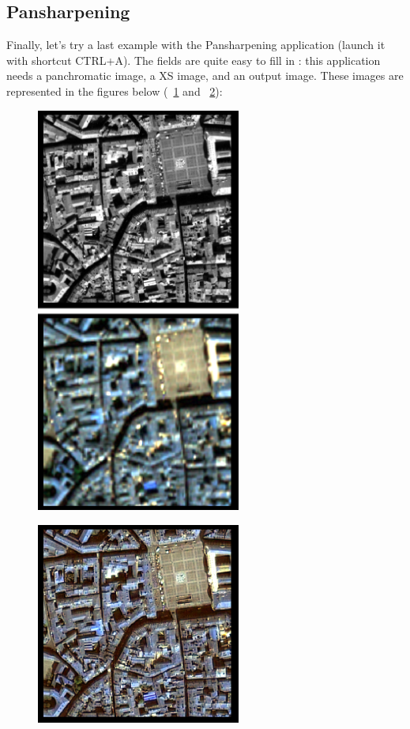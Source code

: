 \subsection{Pansharpening}\label{ssec:monpansh}
Finally, let's try a last example with the Pansharpening application (launch it with shortcut CTRL+A).
The fields are quite easy to fill in : this application needs a panchromatic image, a XS image, and an output image.
These images are represented in the figures below (~\ref{fig:ps12} and ~\ref{fig:ps3}):

\begin{figure}[!h] 
  \center
  \includegraphics[width=0.6\textwidth]{../Art/MonteverdiImages/ps1-2.png}
  \label{fig:ps12}
\end{figure}

\begin{figure}[!h] 
  \center
  \includegraphics[width=0.6\textwidth]{../Art/MonteverdiImages/ps3.png}
  \label{fig:ps3}
\end{figure}

